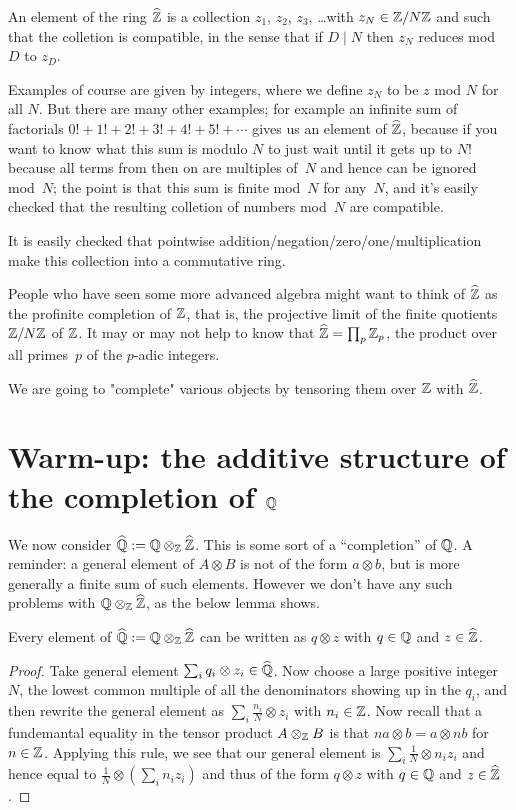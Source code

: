 An element of the ring $\widehat{\mathbb{Z}}$ is a collection $z_1$, $z_2$, $z_3$, \ldots with $z_N\in\mathbb{Z}/N\mathbb{Z}$
and such that the colletion is compatible, in the sense that if $D\mid N$ then $z_N$ reduces mod~$D$
to $z_D$.

Examples of course are given by integers, where we define $z_N$ to be $z$ mod $N$ for all $N$.
But there are many other examples; for example an infinite sum of factorials 
$0!+1!+2!+3!+4!+5!+\cdots$ gives us an element of $\widehat{\mathbb{Z}}$, because if you want to know what
this sum is modulo $N$ to just wait until it gets up to $N!$ because all terms from then on
are multiples of~$N$ and hence can be ignored mod~$N$; the point is that this sum is finite
mod~$N$ for any~$N$, and it's easily checked that the resulting colletion of numbers mod~$N$
are compatible.

It is easily checked that pointwise addition/negation/zero/one/multiplication make this
collection into a commutative ring. 

People who have seen some more advanced algebra might want to think of $\widehat{\mathbb{Z}}$ as
the profinite completion of $\mathbb{Z}$, that is, the projective limit of the finite quotients
$\mathbb{Z}/N\mathbb{Z}$ of $\mathbb{Z}$. It may or may not help to know that $\widehat{\mathbb{Z}}=\prod_p\mathbb{Z}_p$, the product over all
primes~$p$ of the $p$-adic integers.

We are going to "complete" various objects by tensoring them over $\mathbb{Z}$ with $\widehat{\mathbb{Z}}$.

\section{Warm-up: the additive structure of the completion of $\mathbb{Q}$}

We now consider $\widehat{\mathbb{Q}}:=\mathbb{Q}\otimes_{\mathbb{Z}}\widehat{\mathbb{Z}}$. This is some sort of a ``completion'' of $\mathbb{Q}$.
A reminder: a general element of $A\otimes B$ is not of the form $a\otimes b$, but
is more generally a finite sum of such elements. However we don't have any such
problems with $\mathbb{Q}\otimes_{\mathbb{Z}}\widehat{\mathbb{Z}}$, as the below lemma shows.

\begin{lemma}\label{Qhat.canonicalForm} Every element of $\widehat{\mathbb{Q}}:=\mathbb{Q}\otimes_{\mathbb{Z}}\widehat{\mathbb{Z}}$
can be written as $q\otimes z$ with $q\in\mathbb{Q}$ and $z\in\widehat{\mathbb{Z}}$.
\end{lemma}
\begin{proof} Take general element $\sum_i q_i\otimes z_i\in\widehat{\mathbb{Q}}$. Now choose a large 
    positive integer $N$, the lowest
common multiple of all the denominators showing up in the $q_i$, and then rewrite
the general element as $\sum_i \frac{n_i}{N}\otimes z_i$ with $n_i\in\mathbb{Z}$. Now recall that a fundemantal
equality in the tensor product $A\otimes_{\mathbb{Z}} B$ is that $na\otimes b=a\otimes nb$ for $n\in\mathbb{Z}$.
Applying this rule, we see that our general element is $\sum_i \frac{1}{N}\otimes n_i z_i$
and hence equal to $\frac{1}{N}\otimes(\sum_i n_i z_i)$ and thus of the form $q\otimes z$ with $q\in\mathbb{Q}$
and $z\in\widehat{\mathbb{Z}}$.
\end{proof}


